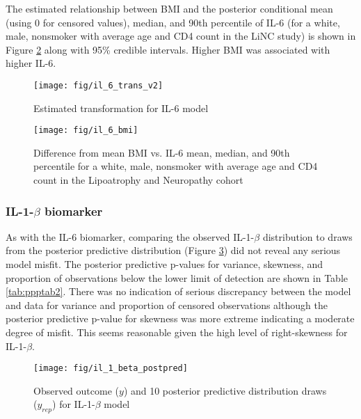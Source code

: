 \documentclass[
]{article}
\begin{document}
The estimated relationship between BMI and the posterior conditional mean (using 0 for censored values), median, and 90th percentile of IL-6 (for a white, male, nonsmoker with average age and CD4 count in the LiNC study) is shown in Figure \ref{fig:il6-bmi} along with 95\% credible intervals. Higher BMI was associated with higher IL-6.

\begin{figure}

{\centering \texttt{[image: fig/il\_6\_trans\_v2]} 

}

\caption{Estimated transformation for IL-6 model}\label{fig:il-6-trans-1}
\end{figure}

\begin{figure}

{\centering \texttt{[image: fig/il\_6\_bmi]} 

}

\caption{Difference from mean BMI vs. IL-6 mean, median, and 90th percentile for a white, male, nonsmoker with average age and CD4 count in the Lipoatrophy and Neuropathy cohort}\label{fig:il6-bmi}
\end{figure}

\hypertarget{il-1-beta-biomarker}{%
\subsubsection{\texorpdfstring{IL-1-\(\beta\) biomarker}{IL-1-\textbackslash beta biomarker}}\label{il-1-beta-biomarker}}

As with the IL-6 biomarker, comparing the observed IL-1-\(\beta\) distribution to draws from the posterior predictive distribution (Figure \ref{fig:il-1-beta-postpred}) did not reveal any serious model misfit. The posterior predictive p-values for variance, skewness, and proportion of observations below the lower limit of detection are shown in Table \ref{tab:ppptab2}. There was no indication of serious discrepancy between the model and data for variance and proportion of censored observations although the posterior predictive p-value for skewness was more extreme indicating a moderate degree of misfit. This seems reasonable given the high level of right-skewness for IL-1-\(\beta\).

\begin{figure}

{\centering \texttt{[image: fig/il\_1\_beta\_postpred]} 

}

\caption{Observed outcome ($y$) and 10 posterior predictive distribution draws ($y_{rep}$) for IL-1-$\beta$ model}\label{fig:il-1-beta-postpred}
\end{figure}
\end{document}
